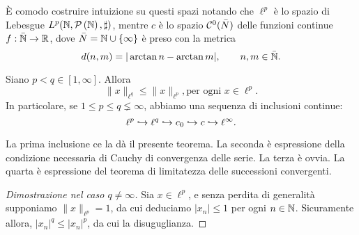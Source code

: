 È comodo costruire intuizione su questi spazi notando che $\ell^p$ è lo spazio di Lebesgue $L^p(\mathbb{N}, \mathcal{P}\left({\mathbb{N}}\right), \sharp)$, mentre $c$ è lo spazio $\mathcal{C}^0(\bar N)$ delle funzioni continue $f : \bar {\mathbb{N}} \to \mathbb{R}$, dove $\bar N = \mathbb{N} \cup \{\infty\}$ è preso con la metrica
\begin{equation*}
	d(n,m) = |\arctan n - \arctan m|, \qquad n, m \in \bar{\mathbb{N}}.
\end{equation*}

\begin{theorem}
	Siano $p<q \in [1, \infty]$.
	Allora
	\begin{equation*}
		\|x\|_{\ell^q} \leq \|x\|_{\ell^p}, \text{per ogni $x \in \ell^p$.}
	\end{equation*}
	In particolare, se $1 \leq p \leq q \lneq \infty$, abbiamo una sequenza di inclusioni continue:
	\begin{equation*}
		\ell^p \hookrightarrow \ell^q \hookrightarrow c_0 \hookrightarrow c \hookrightarrow \ell^\infty.
	\end{equation*}
\end{theorem}
\begin{remark}
	La prima inclusione ce la dà il presente teorema. La seconda è espressione della condizione necessaria di Cauchy di convergenza delle serie. La terza è ovvia. La quarta è espressione del teorema di limitatezza delle successioni convergenti.
\end{remark}
\begin{proof}[Dimostrazione nel caso $q \neq \infty$]
	Sia $x \in \ell^p$, e senza perdita di generalità supponiamo $\|x\|_{\ell^p} = 1$, da cui deduciamo $|x_n| \leq 1$ per ogni $n \in \mathbb{N}$. Sicuramente allora, $|x_n|^q \leq |x_n|^p$, da cui la disuguglianza.
\end{proof}

